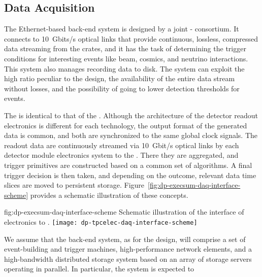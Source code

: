 \subsection{Data Acquisition}
\label{sec:dp-execsum-daq}

The Ethernet-based  back-end system is designed by a joint - consortium. It connects to 
\SI{10}{Gbits/s} optical links that provide continuous, lossless, compressed data streaming from the  crates, and it has the task of determining the trigger conditions for interesting events like beam, cosmics, and  neutrino interactions. This system also manages recording data to disk. The system can exploit the high  ratio peculiar to the  design, the availability of the entire data stream without losses, and the possibility of going to lower detection thresholds for  events.

The   is identical to that of the . %
Although the architecture of the detector readout electronics is different for each technology, the output format of the generated data is common, and both are synchronized to the same global clock signals. The readout data are continuously streamed via \SI{10}{Gbit/s}  optical links by each detector module  electronics system to the . There they are aggregated, and trigger primitives are constructed based on a common set of algorithms. A final trigger decision is then taken, and depending on the outcome, relevant data time slices are moved to persistent storage. Figure~\ref{fig:dp-execsum-daq-interface-scheme} provides a schematic illustration of these concepts.
  

\begin{dunefigure}{fig:dp-execsum-daq-interface-scheme}
{Schematic illustration of the interface of   electronics to .}
\texttt{[image: dp-tpcelec-daq-interface-scheme]}
\end{dunefigure}

 We assume that the  back-end system, as for the  design, will comprise a set of event-building and trigger machines, high-performance network elements, and a high-bandwidth distributed storage system based on an array of storage servers operating in parallel. In particular, the  system is expected to


